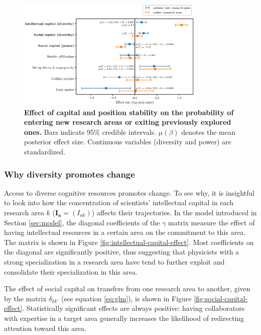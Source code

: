 \documentclass{article}
\begin{document}
\begin{figure}[h]
    \centering
    \includegraphics[width=0.8\textwidth]{plots/exited_score_effects_entropy_magnitude.eps}
    \caption{\textbf{Effect of capital and position stability on the probability of entering new research areas or exiting previously explored ones.} Bars indicate 95\% credible intervals. $\mu(\beta)$ denotes the mean posterior effect size. Continuous variables (diversity and power) are standardized.}
    \label{fig:diversification_score_effect}
\end{figure}


\subsubsection{Why diversity promotes change}

Access to diverse cognitive resources promotes change. To see why, it is insightful to look into how the concentration of scientists' intellectual capital in each research area $k$ ($\bm{I_a}=(I_{ak})$) affects their trajectories. In the model introduced in Section \ref{sec:model}, the diagonal coefficients of the $\gamma$ matrix measure the effect of having intellectual resources in a certain area on the commitment to this area. The matrix is shown in Figure \ref{fig:intellectual-capital-effect}. Most coefficients on the diagonal are significantly positive, thus suggesting that physicists with a strong specialization in a research area have tend to further exploit and consolidate their specialization in this area.

The effect of social capital on transfers from one research area to another, given by the matrix $\delta_{kk'}$ (see equation \ref{eq:glm}), is shown in Figure \ref{fig:social-capital-effect}. Statistically significant effects are always positive: having collaborators with expertise in a target area generally increases the likelihood of redirecting attention toward this area.
\end{document}
